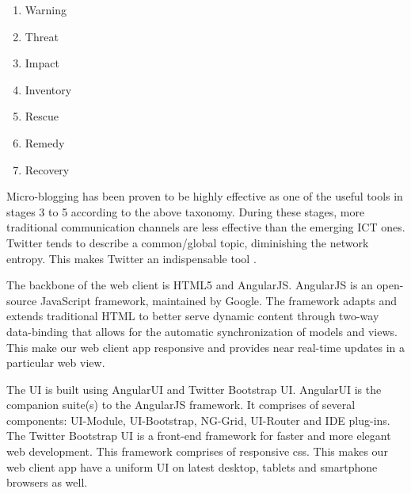 \begin{enumerate}
\item Warning
\item Threat
\item Impact
\item Inventory
\item Rescue
\item Remedy
\item Recovery
\end{enumerate}
Micro-blogging has been proven to be highly effective as one of the useful tools in stages 3 to 5 according to the above taxonomy. During these stages, more traditional communication channels are less effective than the emerging ICT ones. Twitter tends to describe a common/global topic, diminishing the network entropy. This makes Twitter an indispensable tool \cite{Mendoza:2010:TUC:1964858.1964869}.

The backbone of the web client is HTML5 and AngularJS. AngularJS is an open-source JavaScript framework, maintained by Google. The framework adapts and extends traditional HTML to better serve dynamic content through two-way data-binding that allows for the automatic synchronization of models and views. This make our web client app responsive and provides near real-time updates in a particular web view. 

The UI is built using AngularUI and Twitter Bootstrap UI. AngularUI is the companion suite(s) to the AngularJS framework. It comprises of several components: UI-Module, UI-Bootstrap, NG-Grid, UI-Router and IDE plug-ins. The Twitter Bootstrap UI is a front-end framework for faster and more elegant web development. This framework comprises of responsive css. This makes our web client app have a uniform UI on latest desktop, tablets and smartphone browsers as well.

